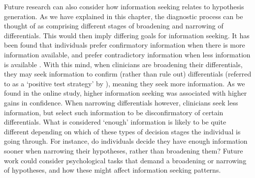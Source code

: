 \documentclass[a4paper, nobind]{templates/ociamthesis}
\begin{document}
Future research can also consider how information seeking relates to hypothesis generation. As we have explained in this chapter, the diagnostic process can be thought of as comprising different stages of broadening and narrowing of differentials. This would then imply differing goals for information seeking. It has been found that individuals prefer confirmatory information when there is more information available, and prefer contradictory information when less information is available \autocite{fischer_selective_2008}. With this mind, when clinicians are broadening their differentials, they may seek information to confirm (rather than rule out) differentials (referred to as a `positive test strategy' by \textcite{klayman_confirmation_1987}), meaning they seek more information. As we found in the online study, higher information seeking was associated with higher gains in confidence. When narrowing differentials however, clinicians seek less information, but select such information to be disconfirmatory of certain differentials. What is considered `enough' information is likely to be quite different depending on which of these types of decision stages the individual is going through. For instance, do individuals decide they have enough information sooner when narrowing their hypotheses, rather than broadening them? Future work could consider psychological tasks that demand a broadening or narrowing of hypotheses, and how these might affect information seeking patterns.\\
\end{document}
